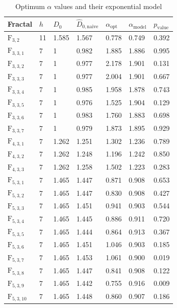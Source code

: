 \begin{table}[tbp]
\centering
\caption{Optimum $\alpha$ values and their exponential model}
\label{tab:table1}
\begin{tabular}{|l||l|l||l|l||l|l|}
\hline
Fractal & $h$ & $D_{0}$ & $\hat{D}_{0,\mathrm{naive}}$ & $\alpha_{\mathrm{opt}}$ & $\alpha_{\mathrm{model}}$ & $p_{\mathrm{value}}$ \\ \hline \hline
$\mathrm{F_{3,2}}$ & 11 & 1.585 & 1.567 & 0.778 & 0.749 &	0.392  \\
$\mathrm{F_{3,3,1}}$ & 7 & 1 & 0.982 & 1.885 & 1.886	& 0.995 \\
$\mathrm{F_{3,3,2}}$ & 7 & 1 & 0.977 & 2.178 & 1.901	& 0.131 \\
$\mathrm{F_{3,3,3}}$ & 7 & 1 & 0.977 & 2.004 &  1.901	& 0.667  \\
$\mathrm{F_{3,3,4}}$ & 7 & 1 & 0.985 & 1.958 &  1.878	& 0.743  \\
$\mathrm{F_{3,3,5}}$ & 7 & 1 & 0.976 & 1.525 &  1.904	& 0.129  \\
$\mathrm{F_{3,3,6}}$ & 7 & 1 & 0.983 & 1.760 &  1.883	& 0.698  \\
$\mathrm{F_{3,3,7}}$ & 7 & 1 & 0.979 & 1.873 &  1.895 &	0.929  \\
$\mathrm{F_{4,3,1}}$ & 7 & 1.262 & 1.251 & 1.302 &  1.236	& 0.789  \\
$\mathrm{F_{4,3,2}}$ & 7 & 1.262 & 1.248 & 1.196 &  1.242	& 0.850  \\
$\mathrm{F_{4,3,3}}$ & 7 & 1.262 & 1.258 & 1.502 &  1.223	& 0.283  \\
$\mathrm{F_{5,3,1}}$ & 7 & 1.465 & 1.447 & 0.871 &  0.908	& 0.653  \\
$\mathrm{F_{5,3,2}}$ & 7 & 1.465 & 1.447 & 0.830 &  0.908	& 0.427  \\
$\mathrm{F_{5,3,3}}$ & 7 & 1.465 & 1.451 & 0.941 &  0.903	& 0.544  \\
$\mathrm{F_{5,3,4}}$ & 7 & 1.465 & 1.445 & 0.886 &  0.911	& 0.720  \\
$\mathrm{F_{5,3,5}}$ & 7 & 1.465 & 1.444 & 0.864 &  0.913	& 0.367  \\
$\mathrm{F_{5,3,6}}$ & 7 & 1.465 & 1.451 & 1.046 &  0.903	& 0.185  \\
$\mathrm{F_{5,3,7}}$ & 7 & 1.465 & 1.453 & 1.061 &  0.900	& 0.019  \\
$\mathrm{F_{5,3,8}}$ & 7 & 1.465 & 1.447 & 0.841 &  0.908	& 0.122  \\
$\mathrm{F_{5,3,9}}$ & 7 & 1.465 & 1.442 & 0.755 &  0.916	& 0.009  \\
$\mathrm{F_{5,3,10}}$ & 7 & 1.465 & 1.448 & 0.860 &  0.907 & 0.186  \\ \hline
\end{tabular}
\end{table}

